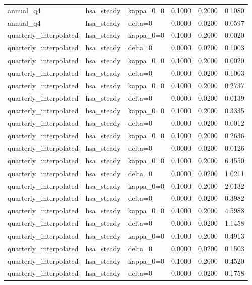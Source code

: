 \begin{tabular}{lllrrr}
annual\_q4 & hsa\_steady & kappa\_0=0 & 0.1000 & 0.2000 & 0.1080 \\
annual\_q4 & hsa\_steady & delta=0 & 0.0000 & 0.0200 & 0.0597 \\
quarterly\_interpolated & hsa\_steady & kappa\_0=0 & 0.1000 & 0.2000 & 0.0020 \\
quarterly\_interpolated & hsa\_steady & delta=0 & 0.0000 & 0.0200 & 0.1003 \\
quarterly\_interpolated & hsa\_steady & kappa\_0=0 & 0.1000 & 0.2000 & 0.0020 \\
quarterly\_interpolated & hsa\_steady & delta=0 & 0.0000 & 0.0200 & 0.1003 \\
quarterly\_interpolated & hsa\_steady & kappa\_0=0 & 0.1000 & 0.2000 & 0.2737 \\
quarterly\_interpolated & hsa\_steady & delta=0 & 0.0000 & 0.0200 & 0.0139 \\
quarterly\_interpolated & hsa\_steady & kappa\_0=0 & 0.1000 & 0.2000 & 0.3335 \\
quarterly\_interpolated & hsa\_steady & delta=0 & 0.0000 & 0.0200 & 0.0012 \\
quarterly\_interpolated & hsa\_steady & kappa\_0=0 & 0.1000 & 0.2000 & 0.2636 \\
quarterly\_interpolated & hsa\_steady & delta=0 & 0.0000 & 0.0200 & 0.0126 \\
quarterly\_interpolated & hsa\_steady & kappa\_0=0 & 0.1000 & 0.2000 & 6.4550 \\
quarterly\_interpolated & hsa\_steady & delta=0 & 0.0000 & 0.0200 & 1.0211 \\
quarterly\_interpolated & hsa\_steady & kappa\_0=0 & 0.1000 & 0.2000 & 2.0132 \\
quarterly\_interpolated & hsa\_steady & delta=0 & 0.0000 & 0.0200 & 0.3982 \\
quarterly\_interpolated & hsa\_steady & kappa\_0=0 & 0.1000 & 0.2000 & 4.5988 \\
quarterly\_interpolated & hsa\_steady & delta=0 & 0.0000 & 0.0200 & 1.1458 \\
quarterly\_interpolated & hsa\_steady & kappa\_0=0 & 0.1000 & 0.2000 & 0.4913 \\
quarterly\_interpolated & hsa\_steady & delta=0 & 0.0000 & 0.0200 & 0.1503 \\
quarterly\_interpolated & hsa\_steady & kappa\_0=0 & 0.1000 & 0.2000 & 0.4520 \\
quarterly\_interpolated & hsa\_steady & delta=0 & 0.0000 & 0.0200 & 0.1758 \\

\end{tabular}
